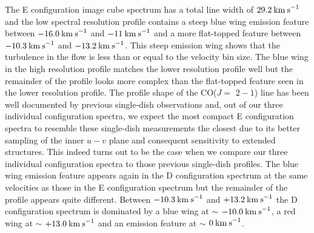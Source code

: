 \documentclass[iop]{emulateapj}
\begin{document}
The E configuration image cube spectrum has a total line width of $29.2\>{\rm km\>s}^{-1}$ and the low spectral resolution profile contains a steep blue wing emission feature between $-16.0\>{\rm km\>s}^{-1}$ and $-11\>{\rm km\>s}^{-1}$ and a more flat-topped feature between $-10.3\>{\rm km\>s}^{-1}$ and $-13.2\>{\rm km\>s}^{-1}$. This steep emission wing shows that the turbulence in the flow is less than or equal to the velocity bin size. The blue wing in the high resolution profile matches the lower resolution profile well but the  remainder of the profile looks more complex than the flat-topped feature seen in the lower resolution profile. The profile shape of the CO($J=$ $2-1$) line has been well documented by previous single-dish observations \citep[e.g.,][]{1980ApJ...242L..25K, 1987ApJ...313..400H} and, out of our three individual configuration spectra, we expect the most compact E configuration spectra to resemble these single-dish measurements the closest due to its better sampling of the inner $u-v$ plane and consequent sensitivity to extended structures. This indeed turns out to be the case when we compare our three individual configuration spectra to those previous single-dish profiles. The blue wing emission feature appears again in the D configuration spectrum at the same velocities as those in the E configuration spectrum but the remainder of the profile appears quite different. Between $-10.3\>{\rm km\>s}^{-1}$ and $+13.2\>{\rm km\>s}^{-1}$ the D configuration spectrum is dominated by a blue wing at $\sim$ $-10.0\>{\rm km\>s}^{-1}$, a red wing at $\sim$ $+13.0\>{\rm km\>s}^{-1}$ and an emission feature at $\sim$ $0\>{\rm km\>s}^{-1}$. 
\end{document}
